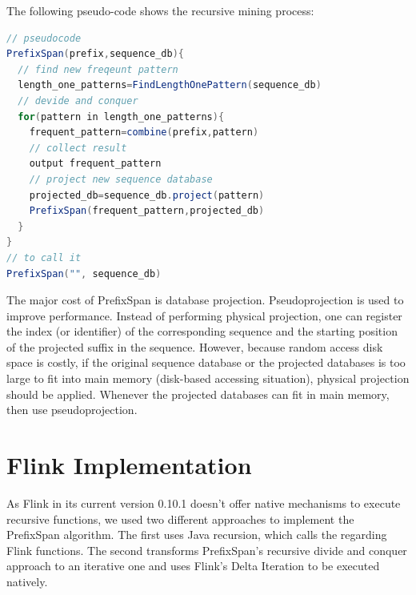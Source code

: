 \documentclass[a4paper,10pt,twocolumn]{article}
\begin{document}
The following pseudo-code shows the recursive mining process:

\begin{lstlisting}[language=Java] 
// pseudocode
PrefixSpan(prefix,sequence_db){
  // find new freqeunt pattern
  length_one_patterns=FindLengthOnePattern(sequence_db)
  // devide and conquer
  for(pattern in length_one_patterns){
    frequent_pattern=combine(prefix,pattern)
    // collect result 
    output frequent_pattern
    // project new sequence database
    projected_db=sequence_db.project(pattern)
    PrefixSpan(frequent_pattern,projected_db)
  }
}
// to call it
PrefixSpan("", sequence_db)
\end{lstlisting}

The major cost of PrefixSpan is database projection. Pseudoprojection is used to improve performance. Instead of performing physical projection, one can register the index (or identifier) of the corresponding sequence and the starting position of the projected suffix in the sequence. However, because random access disk space is costly, if the original sequence database or the projected databases is too large to fit into main memory (disk-based accessing situation), physical projection should be applied. Whenever the projected databases can fit in main memory, then use pseudoprojection.


\section{Flink Implementation}
As Flink in its current version 0.10.1 doesn't offer native mechanisms to execute recursive functions, we used two different approaches to implement the PrefixSpan algorithm. The first uses Java recursion, which calls the regarding Flink functions. The second transforms PrefixSpan's recursive divide and conquer approach to an iterative one and uses Flink's Delta Iteration to be executed natively.
\end{document}
